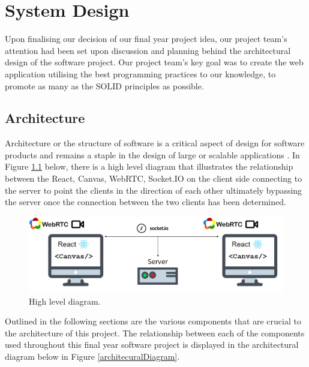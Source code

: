 
\chapter{System Design}
Upon finalising our decision of our final year project idea, our project team’s attention had been set upon discussion and planning behind the architectural design of the software project. Our project team’s key goal was to create the web application utilising the best programming practices to our knowledge, to promote as many as the SOLID principles as possible.

\section{Architecture}
Architecture or the structure of software is a critical aspect of design for software products and remains a staple in the design of large or scalable applications \cite{garlan1995introduction}. In Figure \ref{high-level-diagram} below, there is a high level diagram that illustrates the relationship between the React, Canvas, WebRTC, Socket.IO on the client side connecting to the server to point the clients in the direction of each other ultimately bypassing the server once the connection between the two clients has been determined.

\begin{figure}[H]
    \centering
    \includegraphics[scale=0.4]{img/arc-diagram.png}
    \caption{High level diagram.}
    \label{high-level-diagram}
\end{figure}

Outlined in the following sections are the various components that are crucial to the architecture of this project. The relationship between each of the components used throughout this final year software project is displayed in the architectural diagram below in Figure \ref{architecuralDiagram}.

